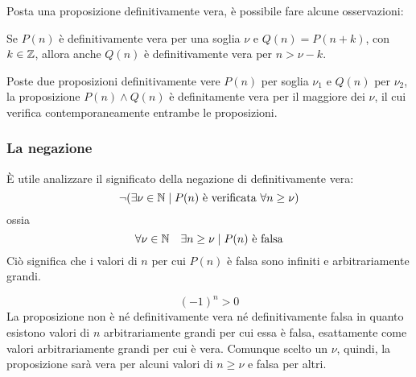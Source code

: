 Posta una proposizione definitivamente vera, è possibile fare alcune osservazioni:
\begin{lemma} \label{lem:defveresoglia}
	Se $P(n)$ è definitivamente vera per una soglia $\nu$ e $Q(n)=P(n+k)$, con $k\in\mathbb{Z}$, allora anche $Q(n)$ è definitivamente vera per $n>\nu-k$.
\end{lemma}
\begin{lemma}
	Poste due proposizioni definitivamente vere $P(n)$ per soglia $\nu_1$ e $Q(n)$ per $\nu_2$, la proposizione $P(n)\land Q(n)$ è definitamente vera per il maggiore dei $\nu$, il cui verifica contemporaneamente entrambe le proposizioni.
\end{lemma}


\subsubsection{La negazione}
È utile analizzare il significato della negazione di definitivamente vera:
\[
	\neg(\exists\nu\in\mathbb{N}\mid P(n) \text{ è verificata }\forall n\geq\nu)
\]
ossia
\[
	\forall\nu\in\mathbb{N} \quad\exists n\geq\nu\mid P(n) \text{ è falsa}
\]
Ciò significa che i valori di $n$ per cui $P(n)$ è falsa sono infiniti e arbitrariamente grandi.
\begin{examp}
	\[
		(-1)^n>0
	\]
	La proposizione non è né definitivamente vera né definitivamente falsa in quanto esistono valori di $n$ arbitrariamente grandi per cui essa è falsa, esattamente come valori arbitrariamente grandi per cui è vera. Comunque scelto un $\nu$, quindi, la proposizione sarà vera per alcuni valori di $n\geq\nu$ e falsa per altri.
\end{examp}
